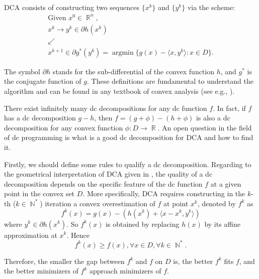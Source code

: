 \documentclass[3p]{elsarticle}
\DeclareMathOperator{\R}{\mathbb{R}}
\DeclareMathOperator{\N}{\mathbb{N}}
\DeclareMathOperator{\argmin}{argmin}
\begin{document}
DCA consists of constructing two sequences $\{x^k\}$ and $\{y^k\}$ via the scheme:
\begin{equation*}
\begin{array}{c}
\text{Given } x^0\in \R^n,\\
x^{k}\rightarrow y^{k}\in \partial
h(x^{k})\\
\swarrow\\
x^{k+1}\in \partial g^{*}(y^{k})=\argmin\{g(x)-\langle x,y^k\rangle: x\in D\}.
\end{array}
\end{equation*}

The symbol $\partial h$ stands for the sub-differential of the convex function $h$, and $g^*$ is the conjugate function of $g$. These definitions are fundamental to understand the algorithm and can be found in any textbook of convex analysis (see e.g., \cite{Rockafellar}). 


There exist infinitely many dc decompositions for any dc function $f$. In fact, if $f$ has a dc decomposition $g-h$, then $f = (g+\phi) - (h+\phi)$ is also a dc decomposition for any convex function $\phi:D\to \R$. An open question in the field of dc programming is what is a good dc decomposition for DCA and how to find it. 

Firstly, we should define some rules to qualify a dc decomposition. Regarding to the geometrical interpretation of DCA given in \cite{Niu10,Niu14}, the quality of a dc decomposition depends on the specific feature of the dc function $f$ at a given point in the convex set $D$. More specifically, 
DCA requires constructing in the $k$-th ($k\in \N^*$) iteration a convex overestimation of $f$ at point $x^k$, denoted by $f^k$ as \begin{equation}
f^k(x) = g(x)-(h(x^{k})+\langle x-x^{k},y^{k}\rangle)
\end{equation} 
where $y^k\in \partial h(x^k)$. So $f^k(x)$ is obtained by replacing $h(x)$ by its affine approximation at $x^k$. Hence  
\begin{equation}\label{eq:fvsfk}
f^k(x)\geq f(x), \forall x\in D, \forall k\in \N^*.
\end{equation} 

Therefore, the smaller the gap between $f^k$ and $f$ on $D$ is, the better $f^k$ fits $f$, and the better minimizers of $f^k$ approach minimizers of $f$. 
\end{document}
